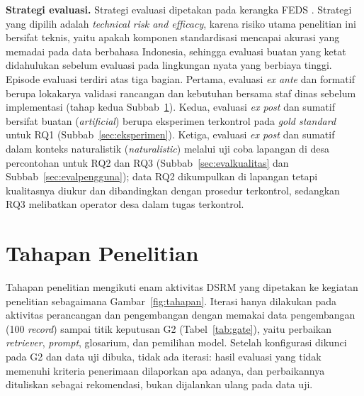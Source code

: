 \textbf{Strategi evaluasi.} Strategi evaluasi dipetakan pada kerangka FEDS \cite{venable2016feds}. Strategi yang dipilih adalah \textit{technical risk and efficacy}, karena risiko utama penelitian ini bersifat teknis, yaitu apakah komponen standardisasi mencapai akurasi yang memadai pada data berbahasa Indonesia, sehingga evaluasi buatan yang ketat didahulukan sebelum evaluasi pada lingkungan nyata yang berbiaya tinggi. Episode evaluasi terdiri atas tiga bagian. Pertama, evaluasi \textit{ex ante} dan formatif berupa lokakarya validasi rancangan dan kebutuhan bersama staf dinas sebelum implementasi (tahap kedua Subbab~\ref{sec:tahapan}). Kedua, evaluasi \textit{ex post} dan sumatif bersifat buatan (\textit{artificial}) berupa eksperimen terkontrol pada \textit{gold standard} untuk RQ1 (Subbab~\ref{sec:eksperimen}). Ketiga, evaluasi \textit{ex post} dan sumatif dalam konteks naturalistik (\textit{naturalistic}) melalui uji coba lapangan di desa percontohan untuk RQ2 dan RQ3 (Subbab~\ref{sec:evalkualitas} dan Subbab~\ref{sec:evalpengguna}); data RQ2 dikumpulkan di lapangan tetapi kualitasnya diukur dan dibandingkan dengan prosedur terkontrol, sedangkan RQ3 melibatkan operator desa dalam tugas terkontrol.

\section{Tahapan Penelitian}
\label{sec:tahapan}

Tahapan penelitian mengikuti enam aktivitas DSRM yang dipetakan ke kegiatan penelitian sebagaimana Gambar~\ref{fig:tahapan}. Iterasi hanya dilakukan pada aktivitas perancangan dan pengembangan dengan memakai data pengembangan (100 \textit{record}) sampai titik keputusan G2 (Tabel~\ref{tab:gate}), yaitu perbaikan \textit{retriever}, \textit{prompt}, glosarium, dan pemilihan model. Setelah konfigurasi dikunci pada G2 dan data uji dibuka, tidak ada iterasi: hasil evaluasi yang tidak memenuhi kriteria penerimaan dilaporkan apa adanya, dan perbaikannya dituliskan sebagai rekomendasi, bukan dijalankan ulang pada data uji.

